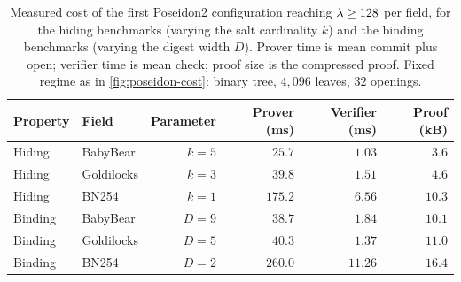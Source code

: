\begin{table}[t]
  \centering
  \small
  \begin{tabular}{llrrrr}
    \toprule
    Property & Field & Parameter & Prover (ms) & Verifier (ms) & Proof (kB) \\
    \midrule
    Hiding  & BabyBear   & $k=5$ & $25.7$  & $1.03$  & $3.6$  \\
    Hiding  & Goldilocks & $k=3$ & $39.8$  & $1.51$  & $4.6$  \\
    Hiding  & BN254      & $k=1$ & $175.2$ & $6.56$  & $10.3$ \\
    \addlinespace
    Binding & BabyBear   & $D=9$ & $38.7$  & $1.84$  & $10.1$ \\
    Binding & Goldilocks & $D=5$ & $40.3$  & $1.37$  & $11.0$ \\
    Binding & BN254      & $D=2$ & $260.0$ & $11.26$ & $16.4$ \\
    \bottomrule
  \end{tabular}
  \caption{Measured cost of the first Poseidon2 configuration reaching
  $\lambda\ge128$ per field, for the hiding benchmarks (varying the salt
  cardinality $k$) and the binding benchmarks (varying the digest width $D$).
  Prover time is mean commit plus open;
  verifier time is mean check; proof size is the compressed proof.  Fixed
  regime as in \cref{fig:poseidon-cost}: binary tree, $4{,}096$ leaves, $32$
  openings.}
  \label{tab:cost-at-128}
\end{table}
